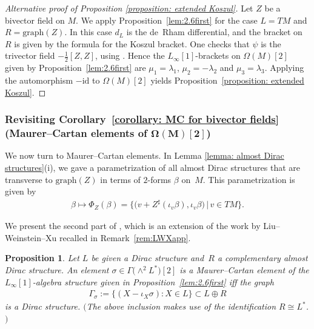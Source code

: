 \documentclass[10pt,a4paper]{amsart}
\numberwithin{equation}{section}
\newtheorem{Proposition}[Theorem]{Proposition}
 { \theoremstyle{definition}
\newtheorem{Definition}[Theorem]{Definition}
\newtheorem{Remark}[Theorem]{Remark} }
\begin{document}
\begin{proof}[Alternative proof of Proposition \ref{proposition: extended Koszul}] Let $Z$ be a bivector field on $M$. We apply Proposition~\ref{lem:2.6first} for the case $L=TM$ and $R=\mathrm{graph}(Z)$. In this case $d_L$ is the de~Rham differential, and the bracket on $R$ is given by the formula for the Koszul bracket. One checks that $\psi $ is the trivector field $-\frac{1}{2}[Z,Z]$, using \cite[Lemma~1.6]{SZPre}. Hence the $L_{\infty}[1]$-brackets on $\Omega(M)[2]$ given by Proposition~\ref{lem:2.6first} are $\mu_1 =\lambda_1$, $\mu_2 =-\lambda_2$ and $\mu_3 =\lambda_3$. Applying the automorphism $-\mathrm{id}$ to $\Omega(M)[2]$ yields Proposition~\ref{proposition: extended Koszul}.
\end{proof}

 \subsubsection[Revisiting Corollary \ref{corollary: MC for bivector fields} (Maurer--Cartan elements of {$\Omega(M)[2]$})]{Revisiting Corollary~\ref{corollary: MC for bivector fields} (Maurer--Cartan elements of $\boldsymbol{\Omega(M)[2]}$)}
We now turn to Maurer--Cartan elements. In Lemma \ref{lemma: almost Dirac structures}(i), we gave a parametrization of all almost Dirac structures that are transverse to $\mathrm{graph}(Z)$ in terms of $2$-forms $\beta$ on~$M$. This parametrization is given by
\begin{gather*}\beta \mapsto \Phi_Z(\beta)=\big\{\big(v+Z^\sharp(\iota_v\beta),\iota_v\beta\big) \, | \, v \in TM\big\}.\end{gather*}

We present the second part of \cite[Lemma~2.6]{FZgeo}, {which is} an extension of the work by Liu--Weinstein--Xu recalled in Remark~\ref{rem:LWXapp}.
\begin{Proposition}\label{proposition: MC for bivector fields}Let $L$ be given a Dirac structure and~$R$ a complementary almost Dirac structure. An element $\sigma\in \Gamma\big({\wedge}^2 L^*\big)[2]$ is a Maurer--Cartan element of the $L_{\infty}[1]$-algebra structure given in Proposition~{\rm \ref{lem:2.6first}} iff the graph \begin{gather*}\Gamma_{\sigma}:= \{ (X-\iota_X \sigma)\colon X\in L\}\subset L\oplus R\end{gather*}
 is a Dirac structure. $($The above inclusion makes use of the identification $R\cong L^*$.$)$
\end{Proposition}
\end{document}

